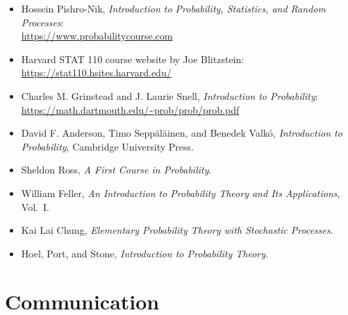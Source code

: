 \documentclass[11pt]{article}
\begin{document}
\begin{itemize}[leftmargin=*]

    \item Hossein Pishro-Nik, 
    \textit{Introduction to Probability, Statistics, and Random Processes}:\\
    \url{https://www.probabilitycourse.com}



    
    \item Harvard STAT 110 course website by Joe Blitzstein:\\
    \url{https://stat110.hsites.harvard.edu/}


    

    \item Charles M. Grinstead and J. Laurie Snell, 
    \textit{Introduction to Probability}:\\
    \url{https://math.dartmouth.edu/~prob/prob/prob.pdf}

    \item David F. Anderson, Timo Seppäläinen, and Benedek Valkó, 
    \textit{Introduction to Probability}, Cambridge University Press.

    \item Sheldon Ross, 
    \textit{A First Course in Probability}.

    \item William Feller, 
    \textit{An Introduction to Probability Theory and Its Applications}, Vol.~I.

    \item Kai Lai Chung, 
    \textit{Elementary Probability Theory with Stochastic Processes}.

    \item Hoel, Port, and Stone, 
    \textit{Introduction to Probability Theory}.

\end{itemize}

\section{Communication}
\end{document}
